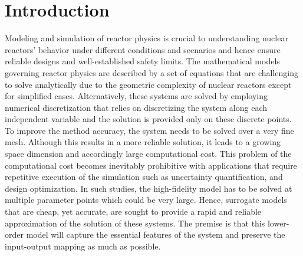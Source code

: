 \documentclass[review,number,sort&compress,12pt]{elsarticle}
\begin{document}
% 

\section{Introduction\label{sect::intro}}

Modeling and simulation of reactor physics is crucial to understanding nuclear reactors' behavior under different conditions and scenarios and hence ensure reliable designs and well-established safety limits.
The mathematical models governing reactor physics are described by a set of equations that are challenging to solve analytically due to the geometric complexity of nuclear reactors except for simplified cases.
Alternatively, these systems are solved by employing numerical discretization that relies on discretizing the system along each independent variable and the solution is provided only on these discrete points.
To improve the method accuracy, the system needs to be solved over a very fine mesh.
Although this results in a more reliable solution, it leads to a growing space dimension and accordingly large computational cost.
This problem of the computational cost becomes inevitably prohibitive with applications that require repetitive execution of the simulation such as uncertainty quantification, and design optimization.
In such studies, the high-fidelity model has to be solved at multiple parameter points which could be very large.
Hence, surrogate models that are cheap, yet accurate, are sought to provide a rapid and reliable approximation of the solution of these systems.
The premise is that this lower-order model will capture the essential features of the system and preserve the input-output mapping as much as possible.
\end{document}
